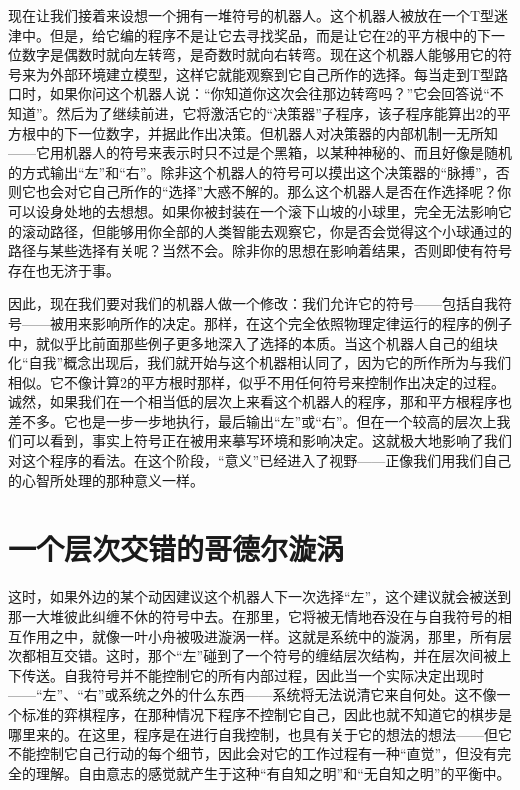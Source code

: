 现在让我们接着来设想一个拥有一堆符号的机器人。这个机器人被放在一个T型迷津中。但是，给它编的程序不是让它去寻找奖品，而是让它在2的平方根中的下一位数字是偶数时就向左转弯，是奇数时就向右转弯。现在这个机器人能够用它的符号来为外部环境建立模型，这样它就能观察到它自己所作的选择。每当走到T型路口时，如果你问这个机器人说：“你知道你这次会往那边转弯吗？”它会回答说“不知道”。然后为了继续前进，它将激活它的“决策器”子程序，该子程序能算出2的平方根中的下一位数字，并据此作出决策。但机器人对决策器的内部机制一无所知——它用机器人的符号来表示时只不过是个黑箱，以某种神秘的、而且好像是随机的方式输出“左”和“右”。除非这个机器人的符号可以摸出这个决策器的“脉搏”，否则它也会对它自己所作的“选择”大惑不解的。那么这个机器人是否在作选择呢？你可以设身处地的去想想。如果你被封装在一个滚下山坡的小球里，完全无法影响它的滚动路径，但能够用你全部的人类智能去观察它，你是否会觉得这个小球通过的路径与某些选择有关呢？当然不会。除非你的思想在影响着结果，否则即使有符号存在也无济于事。

因此，现在我们要对我们的机器人做一个修改：我们允许它的符号——包括自我符号——被用来影响所作的决定。那样，在这个完全依照物理定律运行的程序的例子中，就似乎比前面那些例子更多地深入了选择的本质。当这个机器人自己的组块化“自我”概念出现后，我们就开始与这个机器相认同了，因为它的所作所为与我们相似。它不像计算2的平方根时那样，似乎不用任何符号来控制作出决定的过程。诚然，如果我们在一个相当低的层次上来看这个机器人的程序，那和平方根程序也差不多。它也是一步一步地执行，最后输出“左”或“右”。但在一个较高的层次上我们可以看到，事实上符号正在被用来摹写环境和影响决定。这就极大地影响了我们对这个程序的看法。在这个阶段，“意义”已经进入了视野——正像我们用我们自己的心智所处理的那种意义一样。

\section{一个层次交错的哥德尔漩涡}

这时，如果外边的某个动因建议这个机器人下一次选择“左”，这个建议就会被送到那一大堆彼此纠缠不休的符号中去。在那里，它将被无情地吞没在与自我符号的相互作用之中，就像一叶小舟被吸进漩涡一样。这就是系统中的漩涡，那里，所有层次都相互交错。这时，那个“左”碰到了一个符号的缠结层次结构，并在层次间被上下传送。自我符号并不能控制它的所有内部过程，因此当一个实际决定出现时——“左”、“右”或系统之外的什么东西——系统将无法说清它来自何处。这不像一个标准的弈棋程序，在那种情况下程序不控制它自己，因此也就不知道它的棋步是哪里来的。在这里，程序是在进行自我控制，也具有关于它的想法的想法——但它不能控制它自己行动的每个细节，因此会对它的工作过程有一种“直觉”，但没有完全的理解。自由意志的感觉就产生于这种“有自知之明”和“无自知之明”的平衡中。

